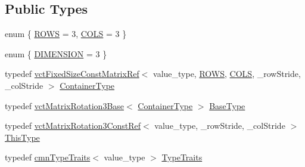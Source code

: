 \subsection*{Public Types}
\begin{DoxyCompactItemize}
\item 
enum \{ \hyperlink{group__cisst_vector_ggab3f61204b713365df89d134aecf5f257a2dfbffc885c6c6a8058f693056581cad}{R\+O\+W\+S} = 3, 
\hyperlink{group__cisst_vector_ggab3f61204b713365df89d134aecf5f257a6703147fc82b54abf5f259f447b078da}{C\+O\+L\+S} = 3
 \}
\item 
enum \{ \hyperlink{group__cisst_vector_ggaa4e695dfd4ce5d7c16cef20759dd2a38a35d674f5d98f31d082dddd79c874ba25}{D\+I\+M\+E\+N\+S\+I\+O\+N} = 3
 \}
\item 
typedef \hyperlink{classvct_fixed_size_const_matrix_ref}{vct\+Fixed\+Size\+Const\+Matrix\+Ref}$<$ value\+\_\+type, \hyperlink{group__cisst_vector_ggab3f61204b713365df89d134aecf5f257a2dfbffc885c6c6a8058f693056581cad}{R\+O\+W\+S}, \hyperlink{group__cisst_vector_ggab3f61204b713365df89d134aecf5f257a6703147fc82b54abf5f259f447b078da}{C\+O\+L\+S}, \+\_\+row\+Stride, \+\_\+col\+Stride $>$ \hyperlink{classvct_matrix_rotation3_const_ref_ae183b3a17186cc240b1cba80e74d0724}{Container\+Type}
\item 
typedef \hyperlink{classvct_matrix_rotation3_base}{vct\+Matrix\+Rotation3\+Base}$<$ \hyperlink{classvct_matrix_rotation3_const_ref_ae183b3a17186cc240b1cba80e74d0724}{Container\+Type} $>$ \hyperlink{classvct_matrix_rotation3_const_ref_a72312c3cf0fe6a145043764cdd412bad}{Base\+Type}
\item 
typedef \hyperlink{classvct_matrix_rotation3_const_ref}{vct\+Matrix\+Rotation3\+Const\+Ref}$<$ value\+\_\+type, \+\_\+row\+Stride, \+\_\+col\+Stride $>$ \hyperlink{classvct_matrix_rotation3_const_ref_a92075d31084a3f4bb466e724a8719693}{This\+Type}
\item 
typedef \hyperlink{classcmn_type_traits}{cmn\+Type\+Traits}$<$ value\+\_\+type $>$ \hyperlink{classvct_matrix_rotation3_const_ref_aa8c0563184a7d080a880ca6b066b2440}{Type\+Traits}
\end{DoxyCompactItemize}
